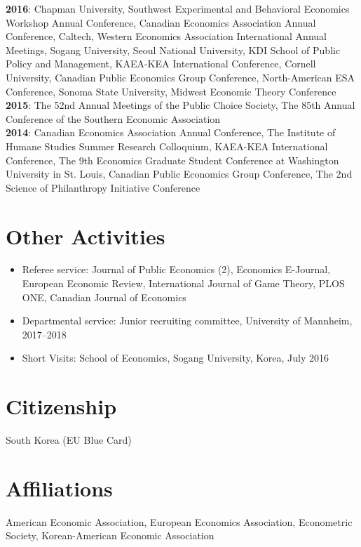\documentclass[margin, letterpaper]{res}
\begin{document}
\begin{resume}
\textbf{2016}: Chapman University, Southwest Experimental and Behavioral Economics Workshop Annual Conference, Canadian Economics Association Annual Conference, Caltech, Western Economics Association International Annual Meetings, Sogang University, Seoul National University, KDI School of Public Policy and Management, KAEA-KEA International Conference, Cornell University, Canadian Public Economics Group Conference, North-American ESA Conference, Sonoma State University, Midwest Economic Theory Conference\\
\textbf{2015}: The 52nd Annual Meetings of the Public Choice Society, The 85th Annual Conference of the Southern Economic Association\\
\textbf{2014}: Canadian Economics Association Annual Conference, The Institute of Humane Studies Summer Research Colloquium, KAEA-KEA International Conference, The 9th Economics Graduate Student Conference at Washington University in St. Louis, Canadian Public Economics Group Conference, The 2nd Science of Philanthropy Initiative Conference

\section{Other Activities}
\begin{itemize}
\item Referee service: Journal of Public Economics (2), Economics E-Journal, European Economic Review, International Journal of Game Theory, PLOS ONE, Canadian Journal of Economics
\item Departmental service: Junior recruiting committee, University of Mannheim, 2017--2018
\item Short Visits: School of Economics, Sogang University, Korea, July 2016
\end{itemize}

\section{Citizenship} South Korea (EU Blue Card)%

\section{Affiliations} American Economic Association, European Economics Association, Econometric Society, Korean-American Economic Association


\end{resume}
\end{document}
